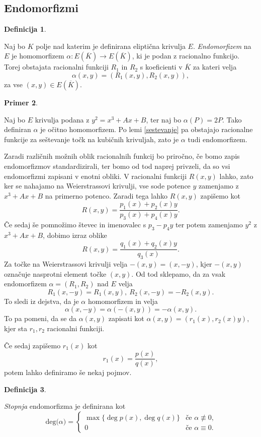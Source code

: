 \documentclass[12pt,a4paper,twoside]{article}
\theoremstyle{definition} %
\newtheorem{definicija}{Definicija}[section]
\newtheorem{primer}[definicija]{Primer}
\theoremstyle{plain} %
\numberwithin{equation}{section}  %
\newcommand{\E}[1]{E({#1})}
\newcommand{\DEG}[1]{\ \text{deg(}{#1}\text{)}}
\begin{document}
\subsection{Endomorfizmi}

\begin{definicija}~

Naj bo $K$ polje nad katerim je definirana eliptična krivulja $E$.
\emph{Endomorfizem} na $E$ je homomorfizem $\alpha: \E{\overline{K}} \rightarrow \E{\overline{K}} $, ki je podan z racionalno funkcijo. Torej obstajata racionalni funkciji $R_1$ in $R_2$ s koeficienti v $\overline{K}$ za kateri velja
$$\alpha(x,y) = (R_1(x,y),R_2(x,y)),$$
za vse $(x,y) \in \E{\overline{K}}$.
\end{definicija}

\begin{primer}~

Naj bo $E$ krivulja podana z $y^2 = x^3+Ax+B$, ter naj bo $\alpha(P) = 2P$. Tako definiran $\alpha$ je očitno homomorfizem. Po lemi \ref{sestevanje} pa obstajajo racionalne funkcije za seštevanje točk na kubičnih krivuljah, zato je $\alpha$ tudi endomorfizem.
\end{primer}

Zaradi različnih možnih oblik racionalnih funkcij bo priročno, če bomo zapis endomorfizmov standardizirali, ter bomo od tod naprej privzeli, da so vsi endomorfizmi zapisani v enotni obliki.
V racionalni funkciji $R(x,y)$ lahko, zato ker se nahajamo na Weierstrassovi krivulji, vse sode potence $y$ zamenjamo z $x^3+Ax+B$ na primerno potenco. Zaradi tega lahko $R(x,y)$ zapišemo kot
$$R(x,y) = \frac{p_1(x)+p_2(x)y}{p_3(x)+p_4(x)y}.$$
Če sedaj še pomnožimo števec in imenovalec s $p_3-p_4y$ ter potem zamenjamo $y^2$ z $x^3+Ax+B$, dobimo izraz oblike
$$R(x,y) = \frac{q_1(x)+q_2(x)y}{q_3(x)}.$$
Za točke na Weierstrassovi krivulji velja $-(x,y) = (x,-y)$, kjer $-(x,y)$ označuje nasprotni element točke $(x,y)$. Od tod sklepamo, da za vsak endomorfizem $\alpha = (R_1,R_2) $ nad $E$ velja
$$R_1(x,-y) = R_1(x,y), \ R_2(x,-y) = -R_2(x,y).$$
To sledi iz dejstva, da je $\alpha$ homomorfizem in velja
$$\alpha(x,-y) = \alpha(-(x,y)) = -\alpha(x,y).$$
To pa pomeni, da se da $\alpha(x,y)$ zapisati kot
$\alpha(x,y) = (r_1(x),r_2(x)y),$
kjer sta $r_1,r_2$ racionalni funkciji.

Če sedaj zapišemo $r_1(x)$ kot
$$r_1(x) = \frac{p(x)}{q(x)},$$
potem lahko definiramo še nekaj pojmov. 

\begin{definicija}~

\emph{Stopnja} endomorfizma je  definirana kot
$$
\DEG{\alpha} =
\begin{cases}
\max \{ \deg{p(x)},\deg{q(x)} \} & \text{če }\alpha \not\equiv 0, \\
0 & \text{če } \alpha \equiv 0.
\end{cases}
$$
\end{definicija}
\end{document}
